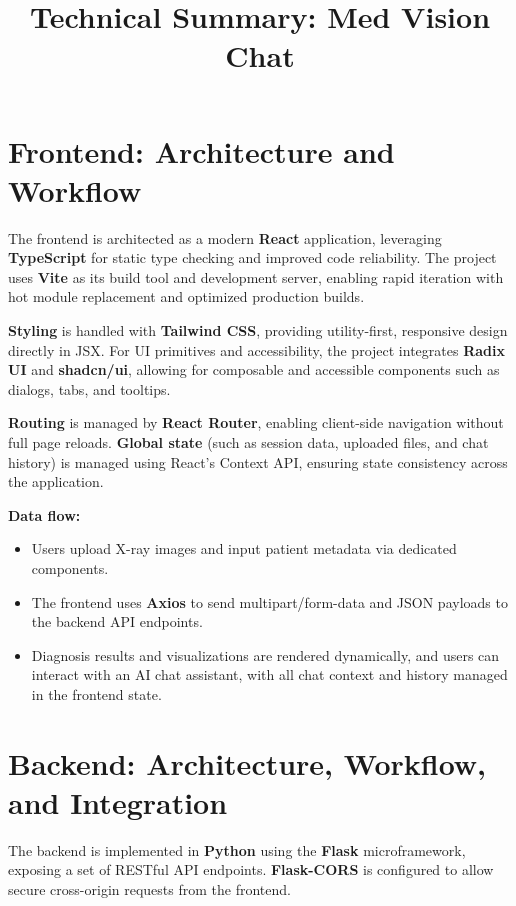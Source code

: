 \documentclass[twocolumn]{article}
\title{\vspace{-2em}\small Technical Summary: Med Vision Chat\vspace{-1em}}
\author{\small}
\date{}
\begin{document}
\maketitle
\vspace{-2em}
\small

\section*{Frontend: Architecture and Workflow}
The frontend is architected as a modern \textbf{React} application, leveraging \textbf{TypeScript} for static type checking and improved code reliability. The project uses \textbf{Vite} as its build tool and development server, enabling rapid iteration with hot module replacement and optimized production builds.

\textbf{Styling} is handled with \textbf{Tailwind CSS}, providing utility-first, responsive design directly in JSX. For UI primitives and accessibility, the project integrates \textbf{Radix UI} and \textbf{shadcn/ui}, allowing for composable and accessible components such as dialogs, tabs, and tooltips.

\textbf{Routing} is managed by \textbf{React Router}, enabling client-side navigation without full page reloads. \textbf{Global state} (such as session data, uploaded files, and chat history) is managed using React's Context API, ensuring state consistency across the application.

\textbf{Data flow:}
\begin{itemize}[leftmargin=2em]
    \item Users upload X-ray images and input patient metadata via dedicated components.
    \item The frontend uses \textbf{Axios} to send multipart/form-data and JSON payloads to the backend API endpoints.
    \item Diagnosis results and visualizations are rendered dynamically, and users can interact with an AI chat assistant, with all chat context and history managed in the frontend state.
\end{itemize}

\columnbreak

\section*{Backend: Architecture, Workflow, and Integration}
The backend is implemented in \textbf{Python} using the \textbf{Flask} microframework, exposing a set of RESTful API endpoints. \textbf{Flask-CORS} is configured to allow secure cross-origin requests from the frontend.
\end{document}
